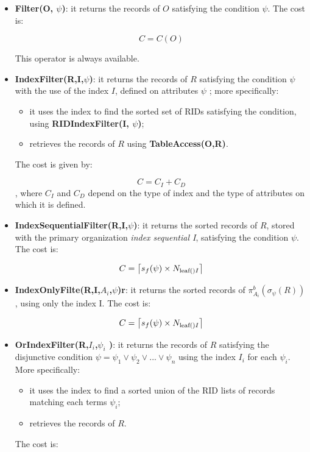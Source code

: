 \begin{itemize}
    \item \textbf{Filter(O, $\psi$)}: it returns the records of $O$ satisfying the condition $\psi$. The cost is:

    $$
    C = C(O)
    $$

    This operator is always available.

    \item \textbf{IndexFilter(R,I,$\psi$)}: it returns the records of $R$ satisfying the condition $\psi$ with the use of the index $I$, defined on attributes $\psi$ ; more specifically:
    \begin{itemize}
        \item it uses the index to find the sorted set of RIDs satisfying the condition, using \textbf{RIDIndexFilter(I, $\psi$)};
        \item retrieves the records of $R$ using \textbf{TableAccess(O,R)}.
    \end{itemize}

    The cost is given by:

    $$
    C = C_I + C_D
    $$
    , where $C_I$ and $C_D$ depend on the type of index and the type of attributes on which it is defined.

    \item \textbf{IndexSequentialFilter(R,I,$\psi$)}: it returns the sorted records of $R$, stored with the primary organization \textit{index sequential I}, satisfying the condition $\psi$. The cost is:

    $$
    C = \ceil*{s_f(\psi) \times N_{\text{leaf}()I}}
    $$

    \item \textbf{IndexOnlyFilte(R,I,$A_i$,$\psi$)r}: it returns the sorted records of $\pi_{A_i}^b(\sigma_{\psi}(R))$, using only the index I. The cost is:

    $$
    C = \ceil*{s_f(\psi) \times N_{\text{leaf}()I}}
    $$

    \item \textbf{OrIndexFilter(R,{$I_i$,$\psi_i$ })}: it returns the records of $R$ satisfying the disjunctive condition $\psi = \psi_1 \lor \psi_2 \lor ... \lor \psi_n$ using the index $I_i$ for each $\psi_i$. More specifically:
    \begin{itemize}
        \item it uses the index to find a sorted union of the RID lists of records matching each terms $\psi_i$;
        \item retrieves the records of $R$.
    \end{itemize}
    The cost is:


\end{itemize}
